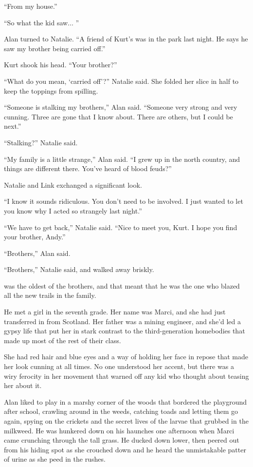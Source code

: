 ``From my house.''

``So what the kid saw...  ''

Alan turned to Natalie.  ``A friend of Kurt's was in the park last
night.  He says he saw my brother being carried off.''

Kurt shook his head.  ``Your brother?''

``What do you mean, `carried off'?'' Natalie said.  She folded her
slice in half to keep the toppings from spilling.

``Someone is stalking my brothers,'' Alan said.  ``Someone very strong
and very cunning.  Three are gone that I know about.  There are
others, but I could be next.''

``Stalking?'' Natalie said.

``My family is a little strange,'' Alan said.  ``I grew up in the
north country, and things are different there.  You've heard of blood
feuds?''

Natalie and Link exchanged a significant look.

``I know it sounds ridiculous.  You don't need to be involved.  I just
wanted to let you know why I acted so strangely last night.''

``We have to get back,'' Natalie said.  ``Nice to meet you, Kurt.  I
hope you find your brother, Andy.''

``Brothers,'' Alan said.

``Brothers,'' Natalie said, and walked away briskly.

 was the oldest of the brothers, and that meant that he was the
one who blazed all the new trails in the family.

He met a girl in the seventh grade.  Her name was Marci, and she had
just transferred in from Scotland.  Her father was a mining engineer,
and she'd led a gypsy life that put her in stark contrast to the
third-generation homebodies that made up most of the rest of their
class.

She had red hair and blue eyes and a way of holding her face in repose
that made her look cunning at all times.  No one understood her
accent, but there was a wiry ferocity in her movement that warned off
any kid who thought about teasing her about it.

Alan liked to play in a marshy corner of the woods that bordered the
playground after school, crawling around in the weeds, catching toads
and letting them go again, spying on the crickets and the secret lives
of the larvae that grubbed in the milkweed.  He was hunkered down on
his haunches one afternoon when Marci came crunching through the tall
grass.  He ducked down lower, then peered out from his hiding spot as
she crouched down and he heard the unmistakable patter of urine as she
peed in the rushes.

